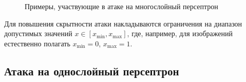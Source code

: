 \begin{figure}[ht]
    \caption{Примеры, участвующие в атаке на многослойный персептрон}
    \label{fig:attack_task}
\end{figure}

Для повышения скрытности атаки накладываются ограничения на диапазон допустимых значений \(x \in [x_{\min}, x_{\max}]\), где, например, для изображений естественно полагать \(x_{\min} = 0\), \(x_{\max} = 1\).

\subsection{Атака на однослойный персептрон}

